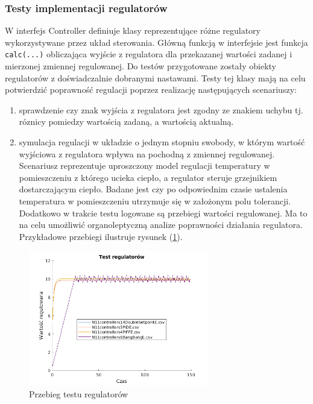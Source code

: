 \documentclass[15pt]{sprawozdanie}
\begin{document}
\subsubsection{Testy implementacji regulatorów}

W interfejs Controller definiuje klasy reprezentujące różne regulatory wykorzystywane przez układ sterowania. Główną funkcją w interfejsie jest funkcja \texttt{calc(...)} obliczająca wyjście z regulatora dla przekazanej wartości zadanej i mierzonej zmiennej regulowanej. Do testów przygotowane zostały obiekty regulatorów z doświadczalnie dobranymi nastawami. Testy tej klasy mają na celu potwierdzić poprawność regulacji poprzez realizację następujących scenariuszy:

\begin{enumerate}
\item sprawdzenie czy znak wyjścia z regulatora jest zgodny ze znakiem uchybu tj. róznicy pomiedzy wartością zadaną, a wartością aktualną.
\item symulacja regulacji w układzie o jednym stopniu swobody, w którym wartość wyjściowa z regulatora wpływa na pochodną z zmiennej regulowanej. Scenariusz reprezentuje uproszczony model regulacji temperatury w pomieszczeniu z którego ucieka ciepło, a regulator steruje grzejnikiem dostarczającym ciepło. Badane jest czy po odpowiednim czasie ustalenia temperatura w pomieszczeniu utrzymuje się w założonym polu tolerancji. Dodatkowo w trakcie testu logowane są przebiegi wartości regulowanej. Ma to na celu umożliwić organoleptyczną analize poprawności działania regulatora. Przykładowe przebiegi ilustruje rysunek (\ref{controller_plot}).
\end{enumerate}

\begin{figure}[!h]
	\centering
	\includegraphics[width=0.7\textwidth]{controller_plot.png}
	\caption{Przebieg testu regulatorów}
	\label{controller_plot}
\end{figure}
\end{document}
